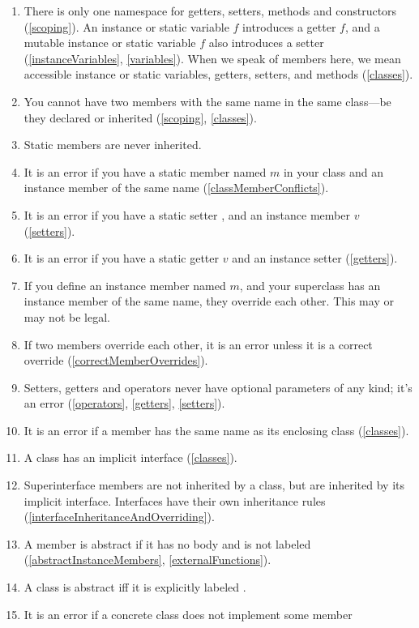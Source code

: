 \documentclass[makeidx]{article}
\begin{document}
{\begin{enumerate}
\item There is only one namespace
  for getters, setters, methods and constructors (\ref{scoping}).
  An instance or static variable $f$ introduces a getter $f$,
  and a mutable instance or static variable $f$ also introduces a setter
   (\ref{instanceVariables}, \ref{variables}).
  When we speak of members here, we mean
  accessible instance or static variables, getters, setters, and methods
  (\ref{classes}).
\item You cannot have two members with the same name in the same class---be
  they declared or inherited (\ref{scoping}, \ref{classes}).
\item Static members are never inherited.
\item It is an error if you have a static member named $m$ in your class
  and an instance member of the same name (\ref{classMemberConflicts}).
\item It is an error if you have a static setter ,
  and an instance member $v$ (\ref{setters}).
\item It is an error if you have a static getter $v$
  and an instance setter  (\ref{getters}).
\item If you define an instance member named $m$,
  and your superclass has an instance member of the same name,
  they override each other.
  This may or may not be legal.
\item \label{typeSigAssignable}
  If two members override each other,
  it is an error unless it is a correct override
  (\ref{correctMemberOverrides}).
\item Setters, getters and operators never have
  optional parameters of any kind;
  it's an error (\ref{operators}, \ref{getters}, \ref{setters}).
\item
  It is an error if a member has the same name as its enclosing class
  (\ref{classes}).
\item A class has an implicit interface (\ref{classes}).
\item Superinterface members are not inherited by a class,
  but are inherited by its implicit interface.
  Interfaces have their own inheritance rules
  (\ref{interfaceInheritanceAndOverriding}).
\item A member is abstract if
  it has no body and is not labeled \EXTERNAL{}
  (\ref{abstractInstanceMembers}, \ref{externalFunctions}).
\item A class is abstract if{}f it is explicitly labeled \ABSTRACT{}.
\item It is an error if a concrete class does not implement some member

\end{enumerate}}
\end{document}
